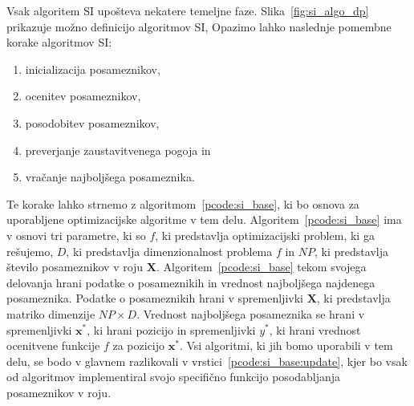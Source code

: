 Vsak algoritem SI upošteva nekatere temeljne faze.
Slika~\ref{fig:si_algo_dp} prikazuje možno definicijo algoritmov SI, 
Opazimo lahko naslednje pomembne korake algoritmov SI:
\begin{enumerate}
    \item inicializacija posameznikov,
    \item ocenitev posameznikov,
    \item posodobitev posameznikov,
    \item preverjanje zaustavitvenega pogoja in
    \item vračanje najboljšega posameznika.
\end{enumerate}
Te korake lahko strnemo z algoritmom~\ref{pcode:si_base}, ki bo osnova za uporabljene optimizacijske algoritme v tem delu.
Algoritem~\ref{pcode:si_base} ima v osnovi tri parametre, ki so $f$, ki predstavlja optimizacijski problem, ki ga rešujemo, $\mathit{D}$, ki predstavlja dimenzionalnost problema $f$ in $\mathit{NP}$, ki predstavlja število posameznikov v roju $\mathbf{X}$.
Algoritem~\ref{pcode:si_base} tekom svojega delovanja hrani podatke o posameznikih in vrednost najboljšega najdenega posameznika.
Podatke o posameznikih hrani v spremenljivki $\mathbf{X}$, ki predstavlja matriko dimenzije $\mathit{NP} \times \mathit{D}$.
Vrednost najboljšega posameznika se hrani v spremenljivki $\mathbf{x}^*$, ki hrani pozicijo in spremenljivki $y^*$, ki hrani vrednost ocenitvene funkcije $f$ za pozicijo $\mathbf{x}^*$.
Vsi algoritmi, ki jih bomo uporabili v tem delu, se bodo v glavnem razlikovali v vrstici~\ref{pcode:si_base:update}, kjer bo vsak od algoritmov implementiral svojo specifično funkcijo posodabljanja posameznikov v roju.

